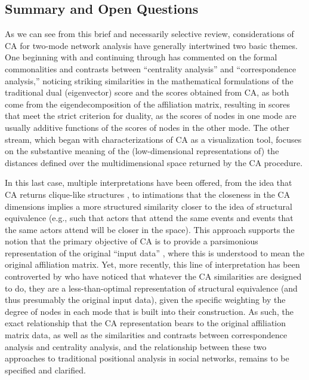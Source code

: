 \documentclass[a4paper,fleqn]{cas-sc}
\begin{document}
\subsection{Summary and Open Questions}
As we can see from this brief and necessarily selective review, considerations of CA for two-mode network analysis have generally intertwined two basic themes. One beginning with \citet{bonacich1991simultaneous} and continuing through \citet{faust1997centrality, faust2005using} has commented on the formal commonalities and contrasts between ``centrality analysis'' and ``correspondence analysis,'' noticing striking similarities in the mathematical formulations of the traditional dual (eigenvector) score and the scores obtained from CA, as both come from the eigendecomposition of the affiliation matrix, resulting in scores that meet the strict criterion for duality, as the scores of nodes in one mode are usually additive functions of the scores of nodes in the other mode. The other stream, which began with characterizations of CA as a visualization tool, focuses on the substantive meaning of the (low-dimensional representations of) the distances defined over the multidimensional space returned by the CA procedure. 

In this last case, multiple interpretations have been offered, from the idea that CA returns clique-like structures \citep{bonacich1991simultaneous}, to intimations that the closeness in the CA dimensions implies a more structured similarity closer to the idea of structural equivalence (e.g., such that actors that attend the same events and events that the same actors attend will be closer in the space). This approach supports the notion that the primary objective of CA is to provide a parsimonious representation of the original ``input data'' \citep{faust2005using}, where this is understood to mean the original affiliation matrix. Yet, more recently, this line of interpretation has been controverted by  \citep{desposito2014comparison} who have noticed that whatever the CA similarities are designed to do, they are a less-than-optimal representation of structural equivalence (and thus presumably the original input data), given the specific weighting by the degree of nodes in each mode that is built into their construction. As such, the exact relationship that the CA representation bears to the original affiliation matrix data, as well as the similarities and contrasts between correspondence analysis and centrality analysis, and the relationship between these two approaches to traditional positional analysis in social networks, remains to be specified and clarified. 
\end{document}
